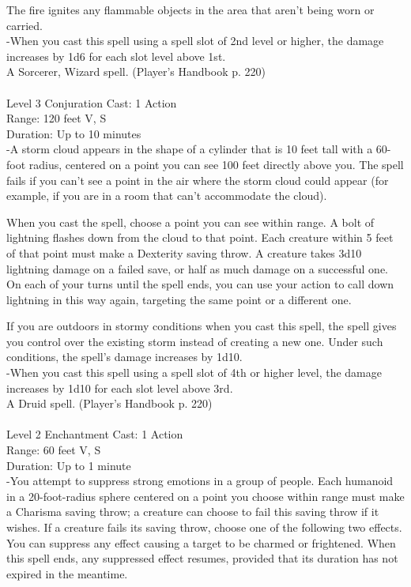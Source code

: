 \documentclass[10pt,twocolumn]{report}
\begin{document}
The fire ignites any flammable objects in the area that aren’t being worn or carried.\\
-When you cast this spell using a spell slot of 2nd level or higher, the damage increases by 1d6 for each slot level above 1st.\\
A Sorcerer, Wizard spell. (Player's Handbook p. 220) \\


 \\
Level 3 \quad Conjuration \quad Cast: 1 Action\\
Range: 120 feet \quad V, S\\
Duration: Up to 10 minutes \quad \\
-A storm cloud appears in the shape of a cylinder that is 10 feet tall with a 60-foot radius, centered on a point you can see 100 feet directly above you. The spell fails if you can’t see a point in the air where the storm cloud could appear (for example, if you are in a room that can’t accommodate the cloud). 

When you cast the spell, choose a point you can see within range. A bolt of lightning flashes down from the cloud to that point. Each creature within 5 feet of that point must make a Dexterity saving throw. A creature takes 3d10 lightning damage on a failed save, or half as much damage on a successful one. On each of your turns until the spell ends, you can use your action to call down lightning in this way again, targeting the same point or a different one. 

If you are outdoors in stormy conditions when you cast this spell, the spell gives you control over the existing storm instead of creating a new one. Under such conditions, the spell’s damage increases by 1d10.\\
-When you cast this spell using a spell slot of 4th or higher level, the damage increases by 1d10 for each slot level above 3rd.\\
A Druid spell. (Player's Handbook p. 220) \\


 \\
Level 2 \quad Enchantment \quad Cast: 1 Action\\
Range: 60 feet \quad V, S\\
Duration: Up to 1 minute \quad \\
-You attempt to suppress strong emotions in a group of people. 
Each humanoid in a 20-foot-radius sphere centered on a point you choose within range must make a Charisma saving throw; a creature can choose to fail this saving throw if it wishes. If a creature fails its saving throw, choose one of the following two effects. You can suppress any effect causing a target to be charmed or frightened. When this spell ends, any suppressed effect resumes, provided that its duration has not expired in the meantime. 
\end{document}
